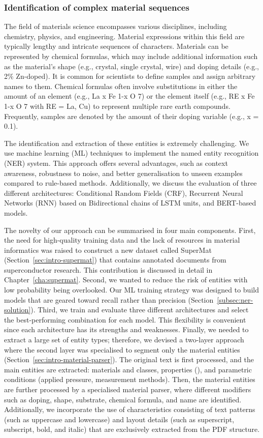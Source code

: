 \subsubsection{Identification of complex material sequences}
\label{sec:intro-ner-materials}
The field of materials science encompasses various disciplines, including chemistry, physics, and engineering. 
Material expressions within this field are typically lengthy and intricate sequences of characters. Materials can be represented by chemical formulas, which may include additional information such as the material's shape (e.g., crystal, single crystal, wire) and doping details (e.g., 2\% Zn-doped). It is common for scientists to define samples and assign arbitrary names to them. Chemical formulas often involve substitutions in either the amount of an element (e.g., La x Fe 1-x O 7) or the element itself (e.g., RE x Fe 1-x O 7 with RE = La, Cu) to represent multiple rare earth compounds. Frequently, samples are denoted by the amount of their doping variable (e.g., x = 0.1).

The identification and extraction of these entities is extremely challenging. 
We use machine learning (ML) techniques to implement the named entity recognition (NER) system. This approach offers several advantages, such as context awareness, robustness to noise, and better generalisation to unseen examples compared to rule-based methods. Additionally, we discuss the evaluation of three different architectures: Conditional Random Fields (CRF), Recurrent Neural Networks (RNN) based on Bidirectional chains of LSTM units, and BERT-based models.

The novelty of our approach can be summarised in four main components. 
First, the need for high-quality training data and the lack of resources in material informatics was raised to construct a new dataset called SuperMat (Section~\ref{sec:intro-supermat}) that contains annotated documents from superconductor research. This contribution is discussed in detail in Chapter~\ref{cha:supermat}.
Second, we wanted to reduce the risk of entities with low probability being overlooked. Our ML training strategy was designed to build models that are geared toward recall rather than precision (Section~\ref{subsec:ner-solution}).
Third, we train and evaluate three different architectures and select the best-performing combination for each model. This flexibility is convenient since each architecture has its strengths and weaknesses.  
Finally, we needed to extract a large set of entity types; therefore, we devised a two-layer approach where the second layer was specialised to segment only the material entities (Section~\ref{sec:intro-material-parser}).  
The original text is first processed, and the main entities are extracted: materials and classes, properties (\tc), and parametric conditions (applied pressure, measurement methods). 
Then, the material entities are further processed by a specialised material parser, where different modifiers such as doping, shape, substrate, chemical formula, and name are identified. 
Additionally, we incorporate the use of characteristics consisting of text patterns (such as uppercase and lowercase) and layout details (such as superscript, subscript, bold, and italic) that are exclusively extracted from the PDF structure.

